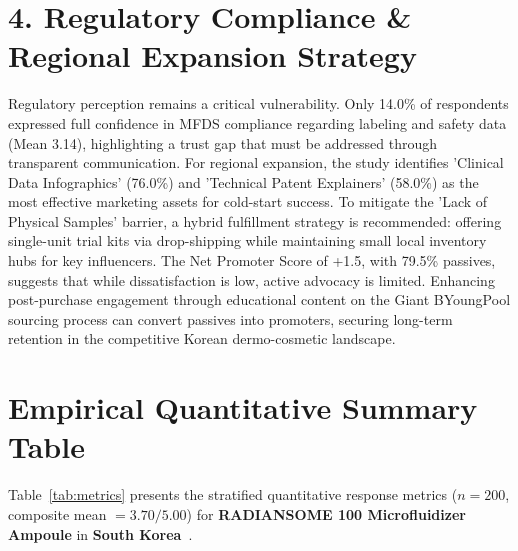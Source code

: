 \documentclass[10pt,twocolumn,a4paper]{article}
\begin{document}
\section{4. Regulatory Compliance \& Regional Expansion Strategy}
Regulatory perception remains a critical vulnerability. Only 14.0\% of respondents expressed full confidence in MFDS compliance regarding labeling and safety data (Mean 3.14), highlighting a trust gap that must be addressed through transparent communication. For regional expansion, the study identifies 'Clinical Data Infographics' (76.0\%) and 'Technical Patent Explainers' (58.0\%) as the most effective marketing assets for cold-start success. To mitigate the 'Lack of Physical Samples' barrier, a hybrid fulfillment strategy is recommended: offering single-unit trial kits via drop-shipping while maintaining small local inventory hubs for key influencers. The Net Promoter Score of +1.5, with 79.5\% passives, suggests that while dissatisfaction is low, active advocacy is limited. Enhancing post-purchase engagement through educational content on the Giant BYoungPool sourcing process can convert passives into promoters, securing long-term retention in the competitive Korean dermo-cosmetic landscape.


\section{Empirical Quantitative Summary Table}
Table~\ref{tab:metrics} presents the stratified quantitative response metrics ($n = 200$, composite mean $= 3.70/5.00$) for \textbf{RADIANSOME 100 Microfluidizer Ampoule} in \textbf{South Korea}~\cite{ref_kaggle_doi,ref_hf_doi}.
\end{document}
